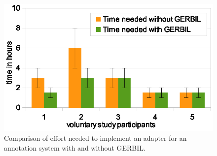 \begin{figure}
\centering
\includegraphics[width=\columnwidth]{chapter_three/benchmarking/WWW_GERBIL/user_study.eps}
\caption{Comparison of effort needed to implement an adapter for an annotation system with and without GERBIL.}
\label{ref:comparedTime}
\end{figure}
